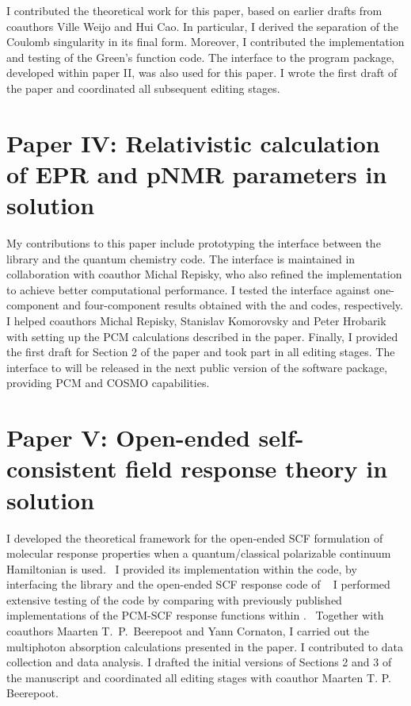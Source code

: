 I contributed the theoretical work for this paper, based on earlier drafts from coauthors
Ville Weijo and Hui Cao. In particular, I derived the separation of
the Coulomb singularity in its final form.
Moreover, I contributed the implementation and testing of the Green's function code.
The interface to the \LSDALTON program package, developed within paper II, was
also used for this paper.
I wrote the first draft of the paper and coordinated all subsequent editing stages.

\section*{Paper IV: Relativistic calculation of EPR and pNMR parameters in solution}

My contributions to this paper include prototyping the interface between the
\pcmsolver library and the \ReSpect quantum chemistry code.
The interface is maintained in collaboration with coauthor Michal Repisky, who also
refined the implementation to achieve better computational performance.
I tested the interface against one-component and four-component results obtained with
the \LSDALTON and \DIRAC codes, respectively.
I helped coauthors Michal Repisky, Stanislav Komorovsky and Peter Hrobarik
with setting up the \acs{PCM} calculations described in the paper.
Finally, I provided the first draft for Section 2 of the paper and took part in all editing stages.
The interface to \ReSpect will be released in the next public version of the software
package, providing \acs{PCM} and \acs{COSMO} capabilities.

\section*{Paper V: Open-ended self-consistent field response theory in solution}

I developed the theoretical framework for the open-ended \acs{SCF} formulation
of molecular response properties when a quantum/classical polarizable continuum
Hamiltonian is used.~\autocite{Thorvaldsen2008-sg, Lipparini2010-be}
I provided its implementation within the \DALTON code, by interfacing the
\pcmsolver library and the open-ended \acs{SCF} response code of
\citeauthor{Ringholm2014-gx}~\autocite{Ringholm2014-gx, Friese2015-kb}
I performed extensive testing of the code by comparing with previously
published implementations of the \acs{PCM}-\acs{SCF} response functions within
\DALTON.~\autocite{Cammi2003-qy, Frediani2005-nc, Ferrighi2010-pm}
Together with coauthors Maarten T.~P.~Beerepoot and Yann Cornaton, I carried out
the multiphoton absorption calculations presented in the paper. I contributed
to data collection and data analysis.
I drafted the initial versions of Sections 2 and 3 of the manuscript and coordinated all
editing stages with coauthor Maarten T. P. Beerepoot.
